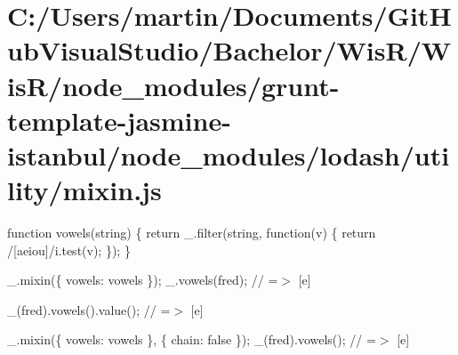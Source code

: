 \hypertarget{_c_1_2_users_2martin_2_documents_2_git_hub_visual_studio_2_bachelor_2_wis_r_2_wis_r_2node_module2f3854f633c4a479bab6819e85c5b435}{}\section{C\+:/\+Users/martin/\+Documents/\+Git\+Hub\+Visual\+Studio/\+Bachelor/\+Wis\+R/\+Wis\+R/node\+\_\+modules/grunt-\/template-\/jasmine-\/istanbul/node\+\_\+modules/lodash/utility/mixin.\+js}
function vowels(string) \{ return \+\_\+.\+filter(string, function(v) \{ return /\mbox{[}aeiou\mbox{]}/i.test(v); \}); \}

\+\_\+.\+mixin(\{ \textquotesingle{}vowels\textquotesingle{}\+: vowels \}); \+\_\+.\+vowels(\textquotesingle{}fred\textquotesingle{}); // =$>$ \mbox{[}\textquotesingle{}e\textquotesingle{}\mbox{]}

\+\_\+(\textquotesingle{}fred\textquotesingle{}).vowels().value(); // =$>$ \mbox{[}\textquotesingle{}e\textquotesingle{}\mbox{]}

\+\_\+.\+mixin(\{ \textquotesingle{}vowels\textquotesingle{}\+: vowels \}, \{ \textquotesingle{}chain\textquotesingle{}\+: false \}); \+\_\+(\textquotesingle{}fred\textquotesingle{}).vowels(); // =$>$ \mbox{[}\textquotesingle{}e\textquotesingle{}\mbox{]}


